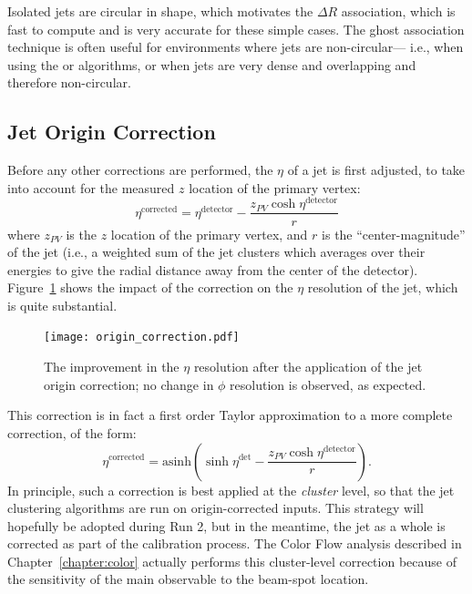 Isolated \antikt jets are circular in shape, which motivates the $\Delta R$ association, which is fast to compute and is very accurate for these simple cases. The ghost association technique is often useful for environments where jets are non-circular--- i.e., when using the \kt or \ca algorithms, or when jets are very dense and overlapping and therefore non-circular.



\subsection{Jet Origin Correction}
\label{jet-reconstruction:origin}
Before any other corrections are performed, the $\eta$ of a jet is first adjusted, to take into account for the measured $z$ location of the primary vertex:
%
\begin{equation}
\eta^\mathrm{corrected} = \eta^\mathrm{detector} - \frac{z_{PV} \cosh \eta^\mathrm{detector} }{r}
\end{equation}
%
where $z_{PV}$ is the $z$ location of the primary vertex, and $r$ is the ``center-magnitude'' of the jet (i.e., a weighted sum of the jet clusters which averages over their energies to give the radial distance away from the center of the detector). Figure~\ref{fig:jet-reconstruction:origin_correction} shows the impact of the correction on the $\eta$ resolution of the jet, which is quite substantial.


\begin{figure}
\centering
\texttt{[image: origin\_correction.pdf]}
\label{fig:jet-reconstruction:origin_correction}
\caption{The improvement in the $\eta$ resolution after the application of the jet origin correction; no change in $\phi$ resolution is observed, as expected.}
\end{figure}


This correction is in fact a first order Taylor approximation to a more complete correction, of the form:
%
\begin{equation}
\eta^\mathrm{corrected} = \mathrm{asinh} \left(\sinh \eta^\mathrm{det} - \frac{z_{PV} \cosh \eta^\mathrm{detector}}{r}  \right).
\end{equation}
%
In principle, such a correction is best applied at the \textit{cluster} level, so that the jet clustering algorithms are run on origin-corrected inputs. This strategy will hopefully be adopted during Run 2, but in the meantime, the jet as a whole is corrected as part of the calibration process. The Color Flow analysis described in Chapter~\ref{chapter:color} actually performs this cluster-level correction because of the sensitivity of the main observable to the beam-spot location.


